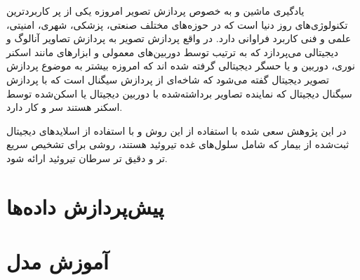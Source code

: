 
یادگیری ماشین و به خصوص پردازش تصویر امروزه یکی از پر کاربردترین تکنولوژی‌های روز دنیا است که در حوزه‌های مختلف صنعتی، پزشکی، شهری، امنیتی، علمی و فنی کاربرد فراوانی دارد.
در واقع پردازش تصویر به پردازش تصاویر آنالوگ و دیجیتالی می‌پردازد که به ترتیب توسط دوربین‌های معمولی و ابزارهای مانند اسکنر نوری، دوربین و یا حسگر دیجیتالی گرفته شده اند
که امروزه بیشتر به موضوع پردازش تصویر دیجیتال گفته می‌شود که شاخه‌ای از پردازش سیگنال است که با پردازش سیگنال دیجیتال که نماینده تصاویر برداشته‌شده با دوربین دیجیتال یا اسکن‌شده توسط اسکنر هستند سر و کار دارد.

در این پژوهش سعی شده با استفاده از این روش و با استفاده از اسلاید‌های دیجیتال ثبت‌شده از بیمار که شامل سلول‌های غده تیروئید هستند، روشی برای تشخیص سریع تر و دقیق تر سرطان تیروئید ارائه شود.


\section{پیش‌پردازش داده‌ها}\label{sec:پیش-پردازش-داده-ها}



\section{آموزش مدل}\label{sec:آموزش مدل}

